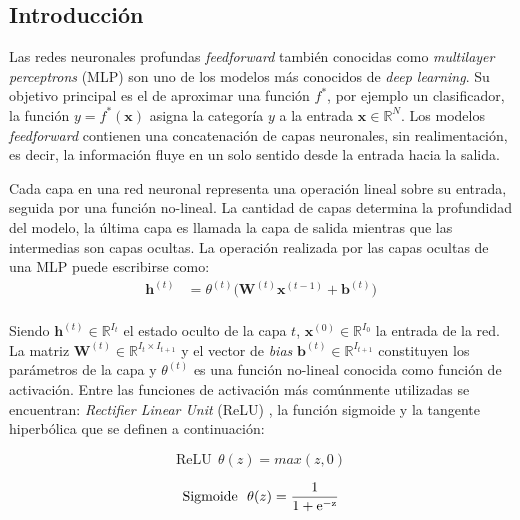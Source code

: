 \documentclass[spanish]{article}
\theoremstyle{definition}
\theoremstyle{remark}
\numberwithin{equation}{section}
\numberwithin{equation}{section} %
\begin{document}
\clearpage
\subsection{Introducción} \label{ssec:introduccion_redes}
Las redes neuronales profundas \textit{feedforward} \cite{goodfellow2016deep} también conocidas como \textit{multilayer perceptrons} (MLP) son uno de los modelos más conocidos de \textit{deep learning}. Su objetivo principal es el de aproximar una función $f^*$, por ejemplo un clasificador, la función  $y=f^*(\mathbf{x}) $ asigna la categoría $y$ a la entrada $\mathbf{x} \in \mathbb{R}^{N}$. Los modelos \textit{feedforward} contienen una concatenación de capas neuronales, sin realimentación, es decir, la información fluye en un solo sentido desde la entrada hacia la salida.\par 
Cada capa en una red neuronal representa una operación lineal sobre su entrada, seguida por una función no-lineal. La cantidad de capas determina la profundidad del modelo, la última capa es llamada la capa de salida mientras que las intermedias son capas ocultas. La operación realizada por las capas ocultas de una MLP puede escribirse como:
\begin{equation}
\label{Eq_MLP}
\begin{split}
\boldsymbol{h}^{(t)}&
    =   \theta^{(t)}\Big(\boldsymbol{W}^{(t)}\boldsymbol{x}^{(t-1)}+\boldsymbol{b}^{(t)}\Big) \\
\end{split}
\end{equation} \par
Siendo $\boldsymbol{h}^{(t)}\in \mathbb{R}^{I_t}$ el estado oculto de la capa $t$,  $\boldsymbol{x}^{(0)} \in \mathbb{R}^{I_0}$ la entrada de la red.
La matriz $\boldsymbol{W}^{(t)}\in \mathbb{R}^{I_t \times I_{t+1}}$ y el vector de \textit{bias} $\boldsymbol{b}^{(t)}\in \mathbb{R}^{I_{t+1}}$ constituyen los parámetros de la capa y $\theta^{(t)}$ es una función no-lineal conocida como función de activación. Entre las funciones de activación más comúnmente utilizadas se encuentran: \textit{Rectifier Linear Unit} (ReLU) \cite{nair2010rectified}, la función sigmoide y la tangente hiperbólica que se definen a continuación:
\par
\begin{equation}
\label{Eq_ReLU}
\textrm{ReLU}\ \  \theta(z) = max(z,0) 
\end{equation} \par
\begin{equation}
\label{Eq_Sig}
\textrm{Sigmoide}\ \  \theta(z) =  \frac{1}{1+\rm{e}^{-z}}
\end{equation} \par
\end{document}
